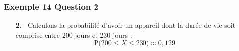 \documentclass[xcolor=svgnames,t,final]{beamer}
\newcommand{\proba}[1]{\text{P}\big(#1\big)}
\begin{document}
\begin{frame}

\frametitle{Exemple 14 Question 2}

 
\begin{enumerate}

\item[\textbf{2.}~]  
Calculons la probabilité d'avoir un appareil dont la durée de vie soit comprise entre 200 jours
et 230 jours :
\begin{equation*}
\proba{200  \leqslant X \leqslant 230} \approx \boxed{0,129}
\end{equation*}

\end{enumerate}

\end{frame}
\end{document}
